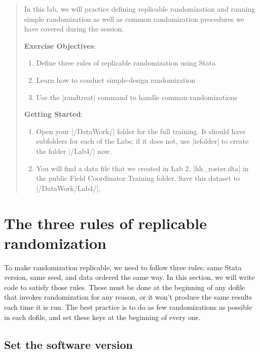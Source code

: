 \documentclass{tufte-handout}
\begin{document}
\begin{abstract}
In this lab, we will practice defining replicable randomization
and running simple randomization as well as
common randomization procedures we have covered during the session.

\bigskip\noindent \textbf{Exercise Objectives}:
\begin{enumerate}
  \item Define three rules of replicable randomization using Stata
  \item Learn how to conduct simple-design randomization
  \item Use the |randtreat| command to handle common randomizations
\end{enumerate}

\bigskip\noindent \textbf{Getting Started}:
\begin{enumerate}
 \item Open your |/DataWork/| folder for the full training. It should have subfolders for each of the Labs; if it does not, use |iefolder| to create the folder |/Lab4/| now.
 \item You will find a data file that we created in Lab 2, |hh_roster.dta| in the public Field Coordinator Training folder. Save this dataset to |/DataWork/Lab4/|.
\end{enumerate}
\end{abstract}

\section{The three rules of replicable randomization}

To make randomization replicable, we need to follow three rules:
same Stata version, same seed, and data ordered the same way.
In this section, we will write code to satisfy those rules.
These must be done at the beginning of any dofile that invokes randomization
for any reason, or it won’t produce the same results each time it is run.
The best practice is to do as few randomizations as possible in each dofile,
and set these keys at the beginning of every one.

\subsection{Set the software version}
\end{document}

